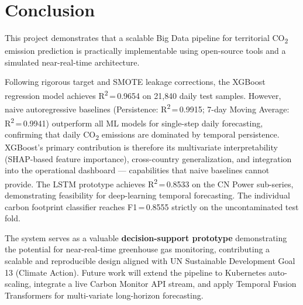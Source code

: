 \documentclass[conference]{IEEEtran}
\begin{document}
\section{Conclusion}

This project demonstrates that a scalable Big Data pipeline for territorial CO\textsubscript{2} emission prediction is practically implementable using open-source tools and a simulated near-real-time architecture. 

Following rigorous target and SMOTE leakage corrections, the XGBoost regression model achieves R\textsuperscript{2}\,=\,0.9654 on 21{,}840 daily test samples. However, naive autoregressive baselines (Persistence: R\textsuperscript{2}\,=\,0.9915; 7-day Moving Average: R\textsuperscript{2}\,=\,0.9941) outperform all ML models for single-step daily forecasting, confirming that daily CO\textsubscript{2} emissions are dominated by temporal persistence. XGBoost's primary contribution is therefore its multivariate interpretability (SHAP-based feature importance), cross-country generalization, and integration into the operational dashboard --- capabilities that naive baselines cannot provide. The LSTM prototype achieves R\textsuperscript{2}\,=\,0.8533 on the CN Power sub-series, demonstrating feasibility for deep-learning temporal forecasting. The individual carbon footprint classifier reaches F1\,=\,0.8555 strictly on the uncontaminated test fold.

The system serves as a valuable \textbf{decision-support prototype} demonstrating the potential for near-real-time greenhouse gas monitoring, contributing a scalable and reproducible design aligned with UN Sustainable Development Goal 13 (Climate Action). Future work will extend the pipeline to Kubernetes auto-scaling, integrate a live Carbon Monitor API stream, and apply Temporal Fusion Transformers for multi-variate long-horizon forecasting.
\end{document}
